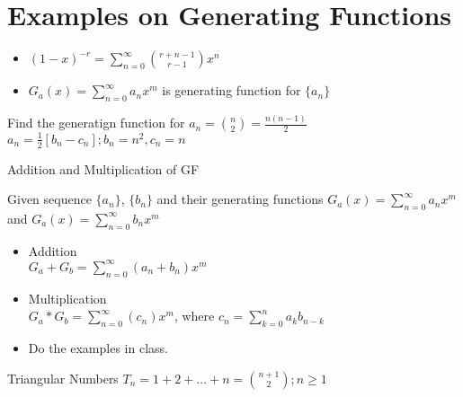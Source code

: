 	

\section{Examples on Generating Functions}

\begin{itemize}
	\item $\left( 1-x \right)^{-r} = \sum_{n=0}^{\infty} \binom{r+n-1}{r-1} x^n$
	\item $G_a(x) = \sum_{n=0}^{\infty} a_n x^m$ is generating function for $\{a_n\} $
\end{itemize}

\begin{example}
	Find the generatign function for $a_n = \binom{n}{2} = \frac{n(n-1)}{2}$ \\ 
	$ a_n = \frac{1}{2}[b_n - c_n] ; b_n = n^2, c_n = n$
\end{example}

\begin{theorem}{ Addition and Multiplication of GF}

\end{theorem} 

Given sequence $\{a_n\}$, $\{b_n\}$ and their generating functions $G_a(x) = \sum_{n=0}^{\infty} a_n x^m$ and $G_a(x) = \sum_{n=0}^{\infty} b_n x^m$ 
\begin{itemize}
	\item Addition \\ $G_a + G_b = \sum_{n=0}^{\infty} (a_n + b_n) x^m$
	\item Multiplication \\ $G_a * G_b = \sum_{n=0}^{\infty} (c_n) x^m$, where $c_n = \sum_{k=0}^{n} a_k b_{n-k}$
\end{itemize}

\begin{example}
	\begin{itemize}
		\item Do the examples in class. 
	\end{itemize}
\end{example}

\begin{definition}{Triangular Numbers}
	$T_n = 1 + 2 + \ldots + n = \binom{n+1}{2} ; n \geq 1$  
\end{definition}


